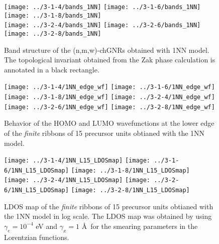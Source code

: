 \documentclass[amsmath,%
amssymb,prb,superscriptaddress]{revtex4}
\begin{document}
\begin{figure*}
	\texttt{[image: ../3-1-4/bands\_1NN]}
	\texttt{[image: ../3-1-6/bands\_1NN]}
	\texttt{[image: ../3-1-8/bands\_1NN]}\\
	\texttt{[image: ../3-2-4/bands\_1NN]}
	\texttt{[image: ../3-2-6/bands\_1NN]}
	\texttt{[image: ../3-2-8/bands\_1NN]}
	\caption{Band structure of the (n,m,w)-chGNRs obtained with 1NN model. The topological invariant obtained from the Zak phase calculation is annotated in a black rectangle. }
\end{figure*}

\begin{figure*}
	\texttt{[image: ../3-1-4/1NN\_edge\_wf]}
	\texttt{[image: ../3-1-6/1NN\_edge\_wf]}
	\texttt{[image: ../3-1-8/1NN\_edge\_wf]}
	\texttt{[image: ../3-2-4/1NN\_edge\_wf]}
	\texttt{[image: ../3-2-6/1NN\_edge\_wf]}
	\texttt{[image: ../3-2-8/1NN\_edge\_wf]}
	\caption{Behavior of the HOMO and LUMO wavefunctions at the lower edge of the \emph{finite} ribbons of 15 precursor units obtianed with the 1NN model.}
\end{figure*}

\begin{figure*}
	\texttt{[image: ../3-1-4/1NN\_L15\_LDOSmap]}
	\texttt{[image: ../3-1-6/1NN\_L15\_LDOSmap]}
	\texttt{[image: ../3-1-8/1NN\_L15\_LDOSmap]}
	\texttt{[image: ../3-2-4/1NN\_L15\_LDOSmap]}
	\texttt{[image: ../3-2-6/1NN\_L15\_LDOSmap]}
	\texttt{[image: ../3-2-8/1NN\_L15\_LDOSmap]}
	\caption{LDOS map of the \emph{finite} ribbons of 15 precursor units obtianed with the 1NN model in log scale. The LDOS map was obtained by using $\gamma_{e}=10^{-4}$ eV and $\gamma_{x}=1$ \AA \ for the smearing parameters in the Lorentzian functions.} %
\end{figure*}
\end{document}

